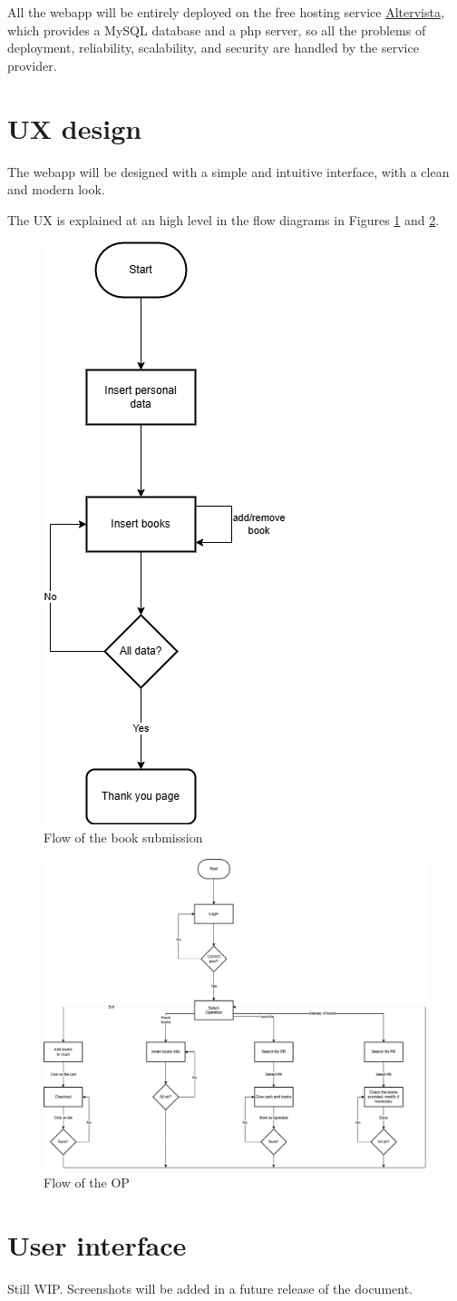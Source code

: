 All the webapp will be entirely deployed on the free hosting service \href{www.altervista.org}{Altervista}, which provides a MySQL database and a php server, so all the problems of deployment, reliability, scalability, and security are handled by the service provider.

\section{UX design}

The webapp will be designed with a simple and intuitive interface, with a clean and modern look.

The UX is explained at an high level in the flow diagrams in Figures \ref{fig:flow_book_submission} and \ref{fig:flow_op}.

\begin{figure}[ht]
    \centering
    \includegraphics[width=.25\textwidth]{assets/flow_book_submission.png}
    \caption{Flow of the book submission}
    \label{fig:flow_book_submission}
\end{figure}

\begin{figure}[ht]
    \centering
    \includegraphics[width=\textwidth]{assets/flow_op.png}
    \caption{Flow of the OP}
    \label{fig:flow_op}
\end{figure}

\section{User interface}

Still WIP. Screenshots will be added in a future release of the document.